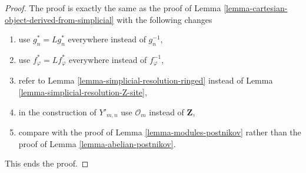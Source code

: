 \documentclass{stacks-project}
\theoremstyle{plain}
\theoremstyle{definition}
\theoremstyle{remark}
\numberwithin{equation}{subsection}
\begin{document}
\begin{proof}
The proof is exactly the same as the proof of
Lemma \ref{lemma-cartesian-object-derived-from-simplicial}
with the following changes
\begin{enumerate}
\item use $g_n^* = Lg_n^*$ everywhere instead of $g_n^{-1}$,
\item use $f_\varphi^* = Lf_\varphi^*$ everywhere instead of $f_\varphi^{-1}$,
\item refer to Lemma \ref{lemma-simplicial-resolution-ringed}
instead of Lemma \ref{lemma-simplicial-resolution-Z-site},
\item in the construction of $Y'_{m, n}$ use
$\mathcal{O}_m$ instead of $\mathbf{Z}$,
\item compare with the proof of Lemma \ref{lemma-modules-postnikov}
rather than the proof of Lemma \ref{lemma-abelian-postnikov}.
\end{enumerate}
This ends the proof.
\end{proof}
\end{document}
